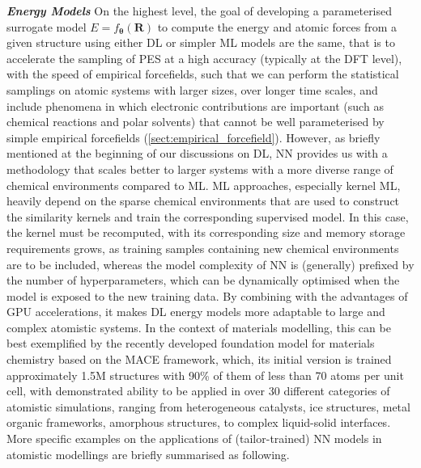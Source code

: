 \textbf{\emph{Energy Models}} On the highest level, the goal of developing a parameterised surrogate model $E=f_{\boldsymbol{\theta}}(\bm{R})$ to compute the energy and atomic forces from a given structure using either DL or simpler ML models are the same, that is to accelerate the sampling of PES at a high accuracy (typically at the DFT level), with the speed of empirical forcefields, such that we can perform the statistical samplings on atomic systems with larger sizes, over longer time scales, and include phenomena in which electronic contributions are important (such as chemical reactions and polar solvents) that cannot be well parameterised by simple empirical forcefields (\cref{sect:empirical_forcefield}). However, as briefly mentioned at the beginning of our discussions on DL, NN provides us with a methodology that scales better to larger systems with a more diverse range of chemical environments compared to ML. ML approaches, especially kernel ML, heavily depend on the sparse chemical environments that are used to construct the similarity kernels and train the corresponding supervised model. In this case, the kernel must be recomputed, with its corresponding size and memory storage requirements grows, as training samples containing new chemical environments are to be included, whereas the model complexity of NN is (generally) prefixed by the number of hyperparameters, which can be dynamically optimised when the model is exposed to the new training data. By combining with the advantages of GPU accelerations, it makes DL energy models more adaptable to large and complex atomistic systems. In the context of materials modelling, this  can be best exemplified by the recently developed foundation model\cite{batatia2023foundation} for materials chemistry based on the MACE\cite{batatia2022mace} framework, which, its initial version  is trained approximately 1.5M structures with 90\% of them of less than 70 atoms per unit cell, with demonstrated ability to be applied in over 30 different categories of atomistic simulations, ranging from heterogeneous catalysts, ice structures, metal organic frameworks, amorphous structures, to complex liquid-solid interfaces. More specific examples on the applications of (tailor-trained) NN models in atomistic modellings are briefly summarised as following.

